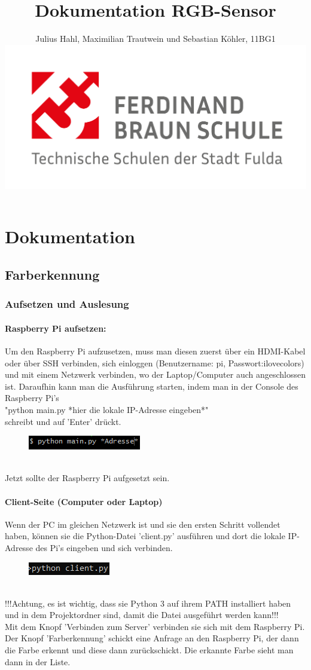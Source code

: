 \documentclass[10pt,a4paper]{report}
\title{Dokumentation RGB-Sensor}
\author{Julius Hahl, Maximilian Trautwein und Sebastian Köhler, 11BG1 \\ \includegraphics[width=\textwidth]{fbs_logo.pdf}}
\begin{document}
	\maketitle
	\newpage
	\tableofcontents
	\newpage
	
	
	\part{Dokumentation}
	\chapter{Farberkennung}
	\newpage
	\section{Aufsetzen und Auslesung}
	\subsection{Raspberry Pi aufsetzen:}
	Um den Raspberry Pi aufzusetzen, muss man diesen zuerst über ein HDMI-Kabel oder über SSH verbinden, sich 			einloggen (Benutzername: pi, Passwort:ilovecolors) und 
	mit einem Netzwerk verbinden, wo der Laptop/Computer auch angeschlossen ist. Daraufhin kann man die Ausführung 		starten, indem man in der Console des Raspberry Pi's \\ "python main.py *hier die lokale IP-Adresse eingeben*" 		\\ schreibt und auf 'Enter' drückt.
	\begin{figure}[h]
	\includegraphics{beispiel.png}
	\end{figure}
	\\
	Jetzt sollte der Raspberry Pi aufgesetzt sein.
	\\
	\subsection{Client-Seite (Computer oder Laptop)}
	Wenn der PC im gleichen Netzwerk ist und sie den ersten Schritt vollendet haben, können sie die Python-Datei 		'client.py' ausführen und dort die lokale IP-Adresse des Pi's eingeben und sich verbinden.

	\begin{figure}[h]
	\includegraphics{beispiel2.png}
	\end{figure}	
	\\
	\noindent
	!!!Achtung, es ist wichtig, dass sie Python 3 auf ihrem PATH installiert haben und in dem Projektordner sind, 
	damit die Datei ausgeführt werden kann!!! 
	\\
	Mit dem Knopf 'Verbinden zum Server' verbinden sie sich mit dem Raspberry Pi. Der Knopf 'Farberkennung' 
	schickt eine Anfrage an den Raspberry Pi, der dann die Farbe erkennt und diese dann zurückschickt. Die erkannte 
	Farbe sieht man dann in der Liste.
	
\end{document}
